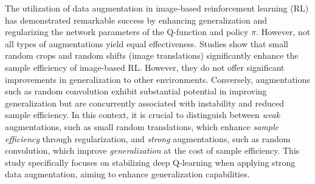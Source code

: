 The utilization of data augmentation in image-based reinforcement learning (RL) has demonstrated remarkable success by enhancing generalization and regularizing the network parameters of the Q-function and policy $\pi$. However, not all types of augmentations yield equal effectiveness. Studies show that small random crops and random shifts (image translations) significantly enhance the sample efficiency of image-based RL. However, they do not offer significant improvements in generalization to other environments. Conversely, augmentations such as random convolution exhibit substantial potential in improving generalization but are concurrently associated with instability and reduced sample efficiency. In this context, it is crucial to distinguish between \textit{weak} augmentations, such as small random translations, which enhance \textit{sample efficiency} through regularization, and \textit{strong} augmentations, such as random convolution, which improve \textit{generalization} at the cost of sample efficiency. This study specifically focuses on stabilizing deep Q-learning when applying strong data augmentation, aiming to enhance generalization capabilities.

